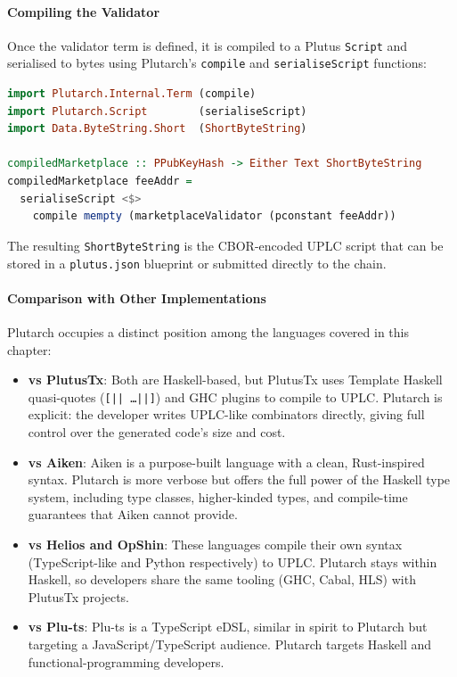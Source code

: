\paragraph{Compiling the Validator}

Once the validator term is defined, it is compiled to a Plutus \texttt{Script} and serialised to bytes using Plutarch's \texttt{compile} and \texttt{serialiseScript} functions:

\begin{lstlisting}[language=haskell, caption=Compiling the Plutarch Validator]
import Plutarch.Internal.Term (compile)
import Plutarch.Script        (serialiseScript)
import Data.ByteString.Short  (ShortByteString)

compiledMarketplace :: PPubKeyHash -> Either Text ShortByteString
compiledMarketplace feeAddr =
  serialiseScript <$>
    compile mempty (marketplaceValidator (pconstant feeAddr))
\end{lstlisting}

The resulting \texttt{ShortByteString} is the CBOR-encoded UPLC script that can be stored in a \texttt{plutus.json} blueprint or submitted directly to the chain.

\paragraph{Comparison with Other Implementations}

Plutarch occupies a distinct position among the languages covered in this chapter:

\begin{itemize}
    \item \textbf{vs PlutusTx}: Both are Haskell-based, but PlutusTx uses Template Haskell quasi-quotes (\texttt{[|| \ldots ||]}) and GHC plugins to compile to UPLC. Plutarch is explicit: the developer writes UPLC-like combinators directly, giving full control over the generated code's size and cost.
    \item \textbf{vs Aiken}: Aiken is a purpose-built language with a clean, Rust-inspired syntax. Plutarch is more verbose but offers the full power of the Haskell type system, including type classes, higher-kinded types, and compile-time guarantees that Aiken cannot provide.
    \item \textbf{vs Helios and OpShin}: These languages compile their own syntax (TypeScript-like and Python respectively) to UPLC. Plutarch stays within Haskell, so developers share the same tooling (GHC, Cabal, HLS) with PlutusTx projects.
    \item \textbf{vs Plu-ts}: Plu-ts is a TypeScript eDSL, similar in spirit to Plutarch but targeting a JavaScript/TypeScript audience. Plutarch targets Haskell and functional-programming developers.
\end{itemize}


